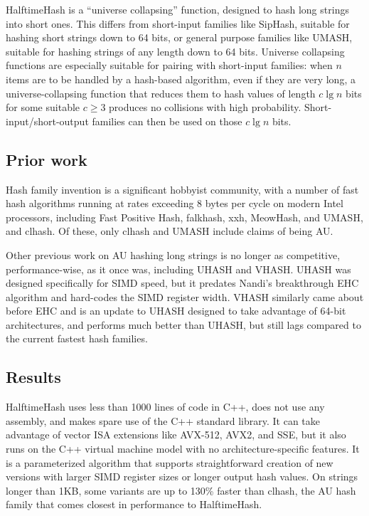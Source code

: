 \documentclass[sigconf, nonacm]{acmart}
\begin{document}
HalftimeHash is a ``universe collapsing'' function, designed to hash long strings into short ones. \cite{linear-hash-functions,hashing-without-primes-revisited,cuckoo-journal}
This differs from short-input families like SipHash, suitable for hashing short strings down to 64 bits, or general purpose families like UMASH, suitable for hashing strings of any length down to 64 bits.
Universe collapsing functions are especially suitable for pairing with short-input families: when $n$ items are to be handled by a hash-based algorithm, even if they are very long, a universe-collapsing function that reduces them to hash values of length $c \lg n$ bits for some suitable $c \geq 3$ produces no collisions with high probability.
Short-input/short-output families can then be used on those $c \lg n$ bits. \cite{universe-collapse-linear-probing,siphash,tabulation,simple-hash-functions-work}

\subsection{Prior work}

Hash family invention is a significant hobbyist community, with a number of fast hash algorithms running at rates exceeding 8 bytes per cycle on modern Intel processors, including Fast Positive Hash, falk\-hash, xxh, Meow\-Hash, and UMASH, and cl\-hash. \cite{smhasher}
Of these, only cl\-hash and U\-MASH include claims of being AU.

Other previous work on AU hashing long strings is no longer as competitive, performance-wise, as it once was, including UHASH and VHASH.
UHASH was designed specifically for SIMD speed, but it predates Nandi's breakthrough EHC algorithm and hard-codes the SIMD register width. \cite{umac}
VHASH similarly came about before EHC and is an update to UHASH designed to take advantage of 64-bit architectures, and performs much better than UHASH, but still lags compared to the current fastest hash families. \cite{vmac,smhasher}

\subsection{Results}

HalftimeHash uses less than 1000 lines of code in C++, does not use any assembly, and makes spare use of the C++ standard library.
It can take advantage of vector ISA extensions like AVX-512, AVX2, and SSE, but it also runs on the C++ virtual machine model with no architecture-specific features.
It is a parameterized algorithm that supports straightforward creation of new versions with larger SIMD register sizes or longer output hash values.
On strings longer than 1KB, some variants are up to 130\% faster than clhash, the AU hash family that comes closest in performance to HalftimeHash.
\end{document}
